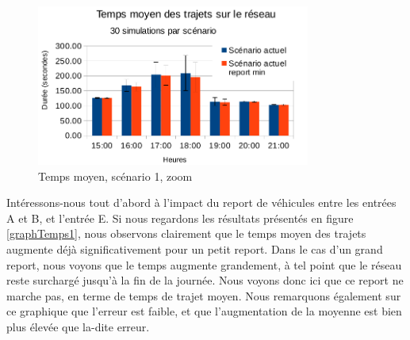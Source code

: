 \documentclass[a4paper,11pt, titlepage]{extarticle}
\begin{document}

\begin{figure}
  \begin{center}
    \includegraphics[width=9cm]{graphiques/temps_scenario1_zoom.png}
  \end{center}
  \caption{Temps moyen, scénario 1, zoom}
  \label{graphTemps1Zoom}
\end{figure}

Intéressons-nous tout d'abord à l'impact du report de véhicules entre les entrées A et B, et l'entrée E. Si nous regardons les résultats présentés en figure \ref{graphTemps1}, nous observons clairement que le temps moyen des trajets augmente déjà significativement pour un petit report. Dans le cas d'un grand report, nous voyons que le temps augmente grandement, à tel point que le réseau reste surchargé jusqu'à la fin de la journée. Nous voyons donc ici que ce report ne marche pas, en terme de temps de trajet moyen. Nous remarquons également sur ce graphique que l'erreur est faible, et que l'augmentation de la moyenne est bien plus élevée que la-dite erreur.
\end{document}
